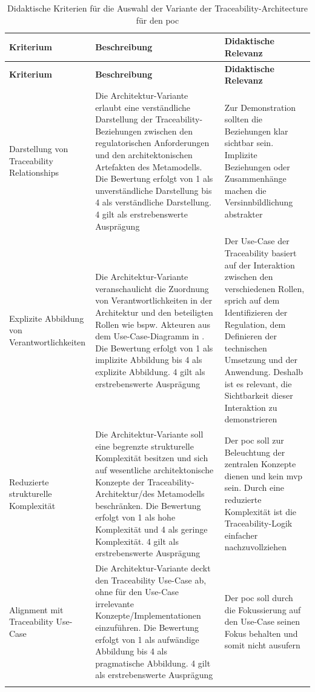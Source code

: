 \begin{longtable}{|
  L{3cm}|
  p{\dimexpr\textwidth-8cm-6\arrayrulewidth\relax}|
  L{5cm}|
}
    \hline
    \textbf{Kriterium} & \textbf{Beschreibung} & \textbf{Didaktische Relevanz} \\
    \hline
    \endfirsthead

    \hline
    \textbf{Kriterium} & \textbf{Beschreibung} & \textbf{Didaktische Relevanz} \\
    \hline
    \endhead

    Darstellung von Traceability Relationships &
    Die Architektur-Variante erlaubt eine verständliche Darstellung der Traceability-Beziehungen zwischen den regulatorischen Anforderungen und den architektonischen Artefakten des Metamodells. Die Bewertung erfolgt von 1 als unverständliche Darstellung bis 4 als verständliche Darstellung. 4 gilt als erstrebenswerte Ausprägung &
    Zur Demonstration sollten die Beziehungen klar sichtbar sein. Implizite Beziehungen oder Zusammenhänge machen die Versinnbildlichung abstrakter
    \\
    \hline

    Explizite Abbildung von Verantwortlichkeiten &
    Die Architektur-Variante veranschaulicht die Zuordnung von Verantwortlichkeiten in der Architektur und den beteiligten Rollen wie bspw. Akteuren aus dem Use-Case-Diagramm in . Die Bewertung erfolgt von 1 als implizite Abbildung bis 4 als explizite Abbildung. 4 gilt als erstrebenswerte Ausprägung &
    Der Use-Case der Traceability basiert auf der Interaktion zwischen den verschiedenen Rollen, sprich auf dem Identifizieren der Regulation, dem Definieren der technischen Umsetzung und der Anwendung. Deshalb ist es relevant, die Sichtbarkeit dieser Interaktion zu demonstrieren
    \\
    \hline

    Reduzierte strukturelle Komplexität &
    Die Architektur-Variante soll eine begrenzte strukturelle Komplexität besitzen und sich auf wesentliche architektonische Konzepte der Traceability-Architektur/des Metamodells beschränken. Die Bewertung erfolgt von 1 als hohe Komplexität und 4 als geringe Komplexität. 4 gilt als erstrebenswerte Ausprägung &
    Der \ac{poc} soll zur Beleuchtung der zentralen Konzepte dienen und kein \ac{mvp} sein. Durch eine reduzierte Komplexität ist die Traceability-Logik einfacher nachzuvollziehen
    \\
    \hline

    Alignment mit Traceability Use-Case &
    Die Architektur-Variante deckt den Traceability Use-Case ab, ohne für den Use-Case irrelevante Konzepte/Implementationen einzuführen. Die Bewertung erfolgt von 1 als aufwändige Abbildung bis 4 als pragmatische Abbildung. 4 gilt als erstrebenswerte Ausprägung &
    Der \ac{poc} soll durch die Fokussierung auf den Use-Case seinen Fokus behalten und somit nicht ausufern
    \\
    \hline
    \caption{Didaktische Kriterien für die Auswahl der Variante der Traceability-Architecture für den \ac{poc}}
    \label{tab:didactic-poc-criteria}
\end{longtable}

